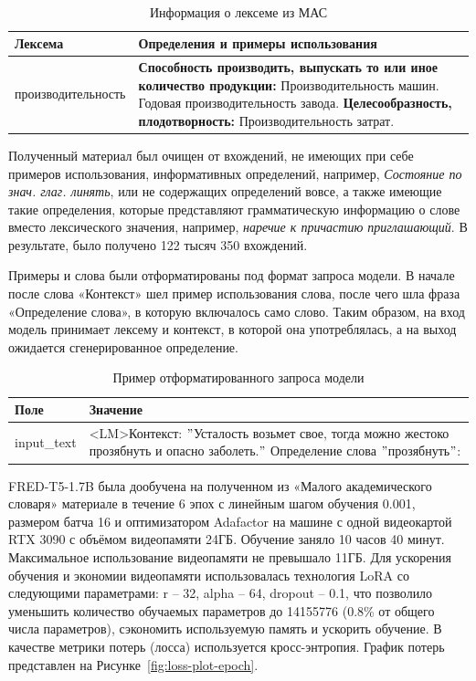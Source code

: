 \documentclass[LI,VKR]{HSEUniversity}
\begin{document}
\begin{table}[H]
\centering
\caption{Информация о лексеме из МАС} \\
\label{tab:Пример МАС}
\begin{tabular}{|m{4.5cm}|m{9.5cm}|}
\hline
\textbf{Лексема} & \textbf{Определения и примеры использования} \\
\hline
производительность & \textbf{Способность производить, выпускать то или иное количество продукции:} Производительность машин. Годовая производительность завода.
\newline \textbf{Целесообразность, плодотворность:} Производительность затрат. \\
\hline
\end{tabular}
\end{table}

Полученный материал был очищен от вхождений, не имеющих при себе примеров использования,
информативных определений, например, \textit{Состояние по знач. глаг. линять},
или не содержащих определений вовсе, а также имеющие такие определения,
которые представляют грамматическую информацию о слове вместо лексического значения,
например, \textit{наречие к причастию приглашающий}.
В результате, было получено 122 тысяч 350 вхождений.

Примеры и слова были отформатированы под формат запроса модели.
В начале после слова «Контекст» шел пример использования слова, после чего шла фраза
«Определение слова», в которую включалось само слово.
Таким образом, на вход модель
принимает лексему и контекст, в которой она употреблялась, а на выход ожидается сгенерированное
определение.

\begin{table}[H]
\centering
\caption{Пример отформатированного запроса модели}
\begin{tabular}{|m{2.5cm}|m{9.5cm}|}
\hline
\textbf{Поле}       & \textbf{Значение}                                                                                          \\
\hline
input\_text  & <LM>Контекст: \("\)Усталость возьмет свое, тогда можно жестоко прозябнуть и опасно заболеть.\("\) Определение слова \("\)прозябнуть\("\): \\
\hline
\end{tabular}
\end{table}

FRED-T5-1.7B была дообучена на полученном из «Малого академического словаря» материале
в течение 6 эпох с линейным шагом обучения 0.001,
размером батча 16 и оптимизатором Adafactor на машине с одной видеокартой RTX 3090
с объёмом видеопамяти 24ГБ.
Обучение заняло 10 часов 40 минут. %
Максимальное использование видеопамяти не превышало 11ГБ. %
Для ускорения обучения и экономии видеопамяти использовалась технология LoRA со
следующими параметрами: r – 32, alpha
 – 64, dropout – 0.1, что позволило
уменьшить количество обучаемых параметров до 14155776 (0.8\% от общего числа параметров),
сэкономить используемую память и ускорить обучение.
В качестве метрики потерь (лосса) используется кросс-энтропия.
График потерь представлен на Рисунке~\ref{fig:loss-plot-epoch}.
\end{document}
